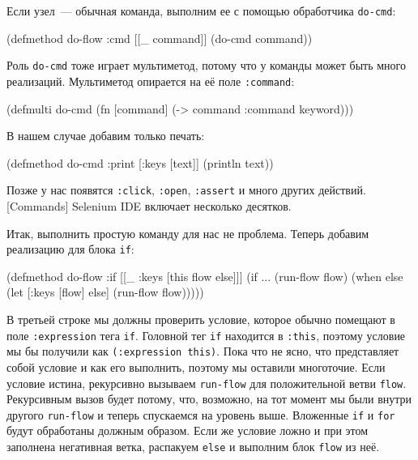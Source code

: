 Если узел~--- обычная команда, выполним ее с помощью обработчика \texttt{do-cmd}:

\begin{english}
  \begin{clojure}
(defmethod do-flow :cmd
  [[_ command]]
  (do-cmd command))
  \end{clojure}
\end{english}

Роль \texttt{do-cmd} тоже играет мультиметод, потому что у команды может быть
много реализаций. Мультиметод опирается на её поле \texttt{:command}:

\begin{english}
  \begin{clojure}
(defmulti do-cmd
  (fn [command]
    (-> command :command keyword)))
  \end{clojure}
\end{english}

\noindent
В нашем случае добавим только печать:

\begin{english}
  \begin{clojure}
(defmethod do-cmd :print
  [{:keys [text]}]
  (println text))
  \end{clojure}
\end{english}

Позже у нас появятся \texttt{:click}, \texttt{:open}, \texttt{:assert} и много
других действий.  [Commands]
Selenium IDE включает несколько десятков.

Итак, выполнить простую команду для нас не проблема. Теперь добавим реализацию
для блока \texttt{if}:

\begin{english}
  \begin{clojure/lines}
(defmethod do-flow :if
  [[_ {:keys [this flow else]}]]
  (if ...
    (run-flow flow)
    (when else
      (let [{:keys [flow]} else]
        (run-flow flow)))))
  \end{clojure/lines}
\end{english}

В третьей строке мы должны проверить условие, которое обычно помещают в поле
\texttt{:expression} тега \texttt{if}. Головной тег \texttt{if} находится в
\texttt{:this}, поэтому условие мы бы получили как \texttt{(:expression this)}.
Пока что не ясно, что представляет собой условие и как его выполнить, поэтому мы
оставили многоточие. Если условие истина, рекурсивно вызываем \texttt{run-flow}
для положительной ветви \texttt{flow}. Рекурсивным вызов будет потому, что,
возможно, на тот момент мы были внутри другого \verb|run-flow| и теперь
спускаемся на уровень выше. Вложенные \texttt{if} и \texttt{for} будут
обработаны должным образом. Если же условие ложно и при этом заполнена
негативная ветка, распакуем \verb|else| и выполним блок \texttt{flow} из неё.

